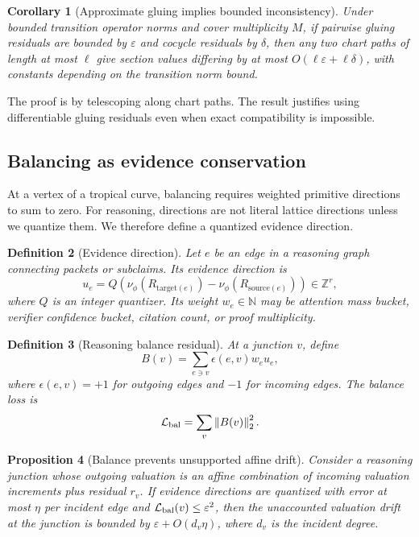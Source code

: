 \documentclass[11pt]{article}
\newtheorem{definition}{Definition}[section]
\newtheorem{proposition}[definition]{Proposition}
\newtheorem{corollary}[definition]{Corollary}
\newcommand{\N}{\mathbb{N}}
\newcommand{\Z}{\mathbb{Z}}
\newcommand{\calL}{\mathcal{L}}
\newcommand{\norm}[1]{\left\lVert #1\right\rVert}
\newcommand{\eps}{\varepsilon}
\begin{document}
\begin{corollary}[Approximate gluing implies bounded inconsistency]
Under bounded transition operator norms and cover multiplicity \(M\), if pairwise gluing residuals are bounded by \(\eps\) and cocycle residuals by \(\delta\), then any two chart paths of length at most \(\ell\) give section values differing by at most \(O(\ell\eps+\ell\delta)\), with constants depending on the transition norm bound.
\end{corollary}

The proof is by telescoping along chart paths.  The result justifies using differentiable gluing residuals even when exact compatibility is impossible.

\subsection{Balancing as evidence conservation}

At a vertex of a tropical curve, balancing requires weighted primitive directions to sum to zero.  For reasoning, directions are not literal lattice directions unless we quantize them.  We therefore define a quantized evidence direction.

\begin{definition}[Evidence direction]
Let \(e\) be an edge in a reasoning graph connecting packets or subclaims.  Its evidence direction is
\begin{equation}
u_e=Q\left(\nu_\phi(R_{\mathrm{target}(e)})-\nu_\phi(R_{\mathrm{source}(e)})\right)\in\Z^r,
\end{equation}
where \(Q\) is an integer quantizer.  Its weight \(w_e\in\N\) may be attention mass bucket, verifier confidence bucket, citation count, or proof multiplicity.
\end{definition}

\begin{definition}[Reasoning balance residual]
At a junction \(v\), define
\begin{equation}
B(v)=\sum_{e\ni v} \epsilon(e,v)w_eu_e,
\end{equation}
where \(\epsilon(e,v)=+1\) for outgoing edges and \(-1\) for incoming edges.  The balance loss is
\begin{equation}
\calL_{\rm bal}=\sum_v\norm{B(v)}_2^2.
\end{equation}
\end{definition}

\begin{proposition}[Balance prevents unsupported affine drift]
Consider a reasoning junction whose outgoing valuation is an affine combination of incoming valuation increments plus residual \(r_v\).  If evidence directions are quantized with error at most \(\eta\) per incident edge and \(\calL_{\rm bal}(v)\le\eps^2\), then the unaccounted valuation drift at the junction is bounded by \(\eps+O(d_v\eta)\), where \(d_v\) is the incident degree.
\end{proposition}
\end{document}
